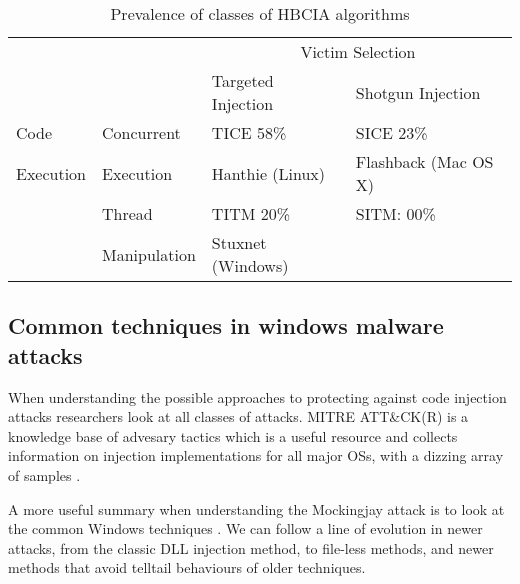 \begin{table}[!ht]
  \centering
  \caption{Prevalence of classes of HBCIA algorithms \autocite{Barabosch:2014}}
\begin{tabular}{ |p{2cm}|p{2cm}||p{3.8cm}|p{3.8cm}|  }
  \hline
  & & \multicolumn{2}{|c|}{Victim Selection} \\
  \cline{3-4}
  & & Targeted Injection & Shotgun Injection \\ 
  \hline
  \hline
  Code  & 	Concurrent  & TICE 58\% & SICE 23\% \\
  Execution & Execution &  Hanthie (Linux) & Flashback (Mac OS X) \\
  \cline{2-4}
  &  Thread  & TITM 20\%  & SITM: 00\% \\
  & Manipulation & Stuxnet (Windows) &  \\
  \hline
\end{tabular}
\label{table: HBCIA}
\end{table}


\subsection{Common techniques in windows malware attacks}

When understanding the possible approaches to protecting against code injection attacks researchers look at all classes of attacks.
MITRE ATT\&CK(R) is a knowledge base of advesary tactics which is a useful resource and collects information on injection implementations
for all major OSs, with a dizzing array of samples \autocite{Mitre:2017}.

A more useful summary when understanding the Mockingjay attack is to look at the common Windows techniques \autocite{Hosseini:2017}.  We
can follow a line of evolution in newer attacks, from the classic DLL injection method, to file-less methods, and newer methods that
avoid telltail behaviours of older techniques.

